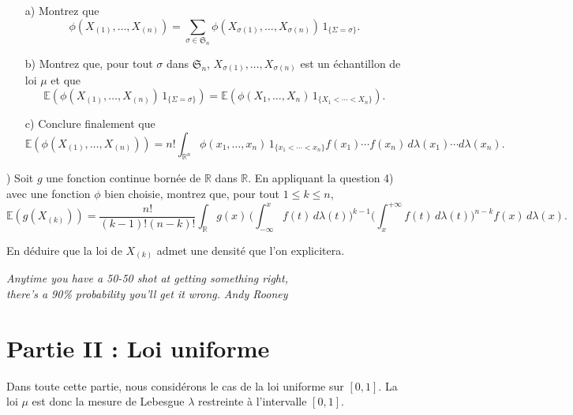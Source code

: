 \documentclass[12pt,a4paper]{article}
\begin{document}
\begin{itemize}
    \item[a)] Montrez que
    \[
    \phi(X_{(1)}, \dots, X_{(n)}) = \sum_{\sigma \in \mathfrak{S}_n} \phi(X_{\sigma(1)}, \dots, X_{\sigma(n)}) \, 1_{\{ \Sigma = \sigma \}}.
    \]

    \item[b)] Montrez que, pour tout $\sigma$ dans $\mathfrak{S}_n$, $X_{\sigma(1)}, \dots, X_{\sigma(n)}$ est un échantillon de loi $\mu$ et que
    \[
    \mathbb{E}\!\left(\phi(X_{(1)}, \dots, X_{(n)}) \, 1_{\{ \Sigma = \sigma \}}\right)
    = \mathbb{E}\!\left( \phi(X_1, \dots, X_n) \, 1_{\{ X_1 < \cdots < X_n \}} \right).
    \]

    \item[c)] Conclure finalement que
    \[
    \mathbb{E}(\phi(X_{(1)}, \dots, X_{(n)})) = n! \int_{\mathbb{R}^n} \phi(x_1, \dots, x_n) \, 1_{\{x_1 < \cdots < x_n\}} f(x_1) \cdots f(x_n) \, d\lambda(x_1) \cdots d\lambda(x_n).
    \]
\end{itemize}

\medskip

) Soit $g$ une fonction continue bornée de $\mathbb{R}$ dans $\mathbb{R}$. En appliquant la question 4) avec une fonction $\phi$ bien choisie, montrez que, pour tout $1 \leq k \leq n$,
\[
\mathbb{E}(g(X_{(k)})) = \frac{n!}{(k-1)! (n-k)!} \int_{\mathbb{R}} g(x) \, \bigg( \int_{-\infty}^x f(t) \, d\lambda(t) \bigg)^{k-1} \bigg( \int_{x}^{+\infty} f(t) \, d\lambda(t) \bigg)^{n-k} f(x) \, d\lambda(x).
\]

\noindent
En déduire que la loi de $X_{(k)}$ admet une densité que l’on explicitera.

\bigskip

\noindent
\emph{Anytime you have a 50-50 shot at getting something right,\\
there’s a 90\% probability you’ll get it wrong.}
\hfill \emph{Andy Rooney}

\section*{Partie II : Loi uniforme}

Dans toute cette partie, nous considérons le cas de la loi uniforme sur $[0,1]$. 
La loi $\mu$ est donc la mesure de Lebesgue $\lambda$ restreinte à l’intervalle $[0,1]$.
\end{document}
